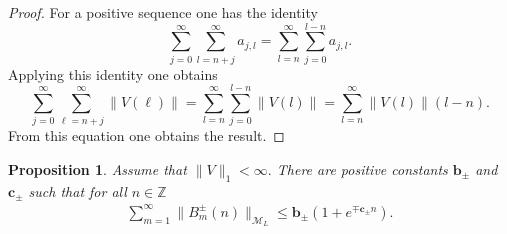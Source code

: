 \documentclass[12pt,oneside,onecolumn,open]{article}
\newtheorem{propo}[teo]{Proposition}
\begin{document}
\begin{proof}

        

For a positive sequence one has the identity 
\begin{equation}
    \sum_{j=0}^\infty \sum_{l=n+j}^\infty a_{j,l}= \sum_{l=n}^\infty \sum_{j=0}^{l-n} a_{j,l}.
\end{equation}
Applying this identity one obtains
\begin{equation}
\sum _{j=0}^{\infty}\sum _{\ell =n+j}^{\infty}\|V(\ell )\| = \sum_{l=n}^\infty  \sum_{j=0}^{l-n} \|V(l)\| = \sum_{l=n}^\infty \|V(l)\| (l-n). 
\end{equation}
From this equation one obtains the result.


\end{proof}




\begin{propo}
\label{ub} Assume that $\|  V\|_1  < \infty.$ There are positive constants $ \mathbf{b}_{\pm} $ and  $  \mathbf{c}_{\pm} $ such that for all $  n \in \mathbb{Z}$
\begin{align}
\sum_{m = 1 }^{\infty} \|   B^{\pm}_{m}(n)  \|_{\mathcal{M}_L
} \leq \mathbf{b}_{\pm} (1 +  e^{ \mp \mathbf{c}_{\pm}  n}). 
\end{align}

\end{propo}
\end{document}
